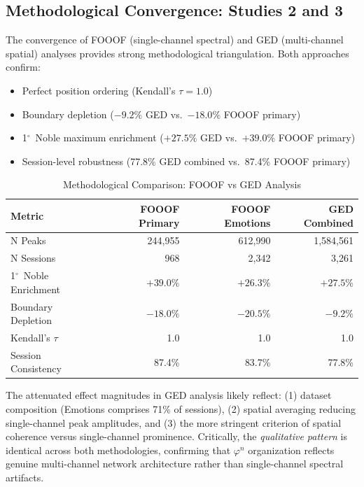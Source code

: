 \documentclass[11pt,a4paper]{article}
\newcommand{\degree}{$^\circ$}  %
\newcommand{\phisym}{\varphi}
\begin{document}
\subsection{Methodological Convergence: Studies 2 and 3}

The convergence of FOOOF (single-channel spectral) and GED (multi-channel spatial) analyses provides strong methodological triangulation. Both approaches confirm:
\begin{itemize}
    \item Perfect position ordering (Kendall's $\tau = 1.0$)
    \item Boundary depletion ($-9.2\%$ GED vs.\ $-18.0\%$ FOOOF primary)
    \item 1\degree\ Noble maximum enrichment ($+27.5\%$ GED vs.\ $+39.0\%$ FOOOF primary)
    \item Session-level robustness (77.8\% GED combined vs.\ 87.4\% FOOOF primary)
\end{itemize}

\begin{table}[H]
\centering
\caption{Methodological Comparison: FOOOF vs GED Analysis}
\label{tab:fooof_vs_ged}
\begin{tabular}{@{}lrrr@{}}
\toprule
Metric & FOOOF Primary & FOOOF Emotions & GED Combined \\
\midrule
N Peaks & 244,955 & 612,990 & 1,584,561 \\
N Sessions & 968 & 2,342 & 3,261 \\
1\degree\ Noble Enrichment & $+39.0\%$ & $+26.3\%$ & $+27.5\%$ \\
Boundary Depletion & $-18.0\%$ & $-20.5\%$ & $-9.2\%$ \\
Kendall's $\tau$ & 1.0 & 1.0 & 1.0 \\
Session Consistency & 87.4\% & 83.7\% & 77.8\% \\
\bottomrule
\end{tabular}
\end{table}

The attenuated effect magnitudes in GED analysis likely reflect: (1) dataset composition (Emotions comprises 71\% of sessions), (2) spatial averaging reducing single-channel peak amplitudes, and (3) the more stringent criterion of spatial coherence versus single-channel prominence. Critically, the \textit{qualitative pattern} is identical across both methodologies, confirming that $\phisym^n$ organization reflects genuine multi-channel network architecture rather than single-channel spectral artifacts.
\end{document}
